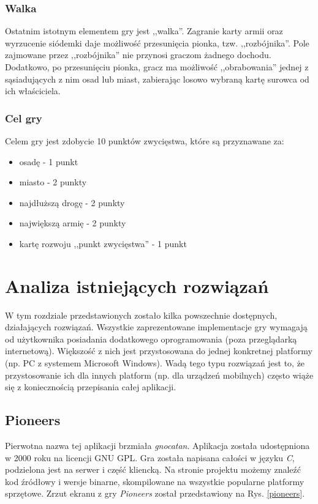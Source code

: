 \documentclass[11pt,twoside]{report}
\providecommand{\imref}[1]{Rys. \ref{#1}} %
\begin{document}
\subsection{Walka}
\label{sec:fight}
Ostatnim istotnym elementem gry jest ,,walka''. Zagranie karty armii
oraz wyrzucenie siódemki daje możliwość przesunięcia pionka,
tzw. ,,rozbójnika''. Pole zajmowane przez ,,rozbójnika'' nie przynosi
graczom żadnego dochodu. Dodatkowo, po przesunięciu pionka, gracz ma
możliwość ,,obrabowania'' jednej z sąsiadujących z nim osad lub miast,
zabierając losowo wybraną kartę surowca od ich właściciela.

\subsection{Cel gry}
Celem gry jest zdobycie 10 punktów zwycięstwa, które są przyznawane
za:

\begin{itemize}
\item osadę - 1 punkt
\item miasto - 2 punkty
\item najdłuższą drogę - 2 punkty
\item największą armię - 2 punkty
\item kartę rozwoju ,,punkt zwycięstwa'' - 1 punkt
\end{itemize}

\cleardoublepage

\chapter{Analiza istniejących rozwiązań}
W tym rozdziale przedstawionych zostało kilka powszechnie dostępnych,
działających rozwiązań. Wszystkie zaprezentowane implementacje gry
wymagają od użytkownika posiadania dodatkowego oprogramowania (poza
przeglądarką internetową). Większość z nich jest przystosowana do
jednej konkretnej platformy (np. PC z systemem Microsoft
Windows). Wadą tego typu rozwiązań jest to, że przystosowanie ich dla
innych platform (np. dla urządzeń mobilnych) często wiąże się z
koniecznością przepisania całej aplikacji.

\section{Pioneers}
Pierwotna nazwa tej aplikacji brzmiała \emph{gnocatan}. Aplikacja
została udostępniona w 2000 roku na licencji GNU GPL. Gra została
napisana całości w języku \emph{C}, podzielona jest na serwer i część
kliencką. Na stronie projektu możemy znaleźć kod źródłowy i wersje
binarne, skompilowane na wszystkie popularne platformy
sprzętowe\cite{pioneers}. Zrzut ekranu z gry \emph{Pioneers} został
przedstawiony na \imref{pioneers}.
\end{document}
